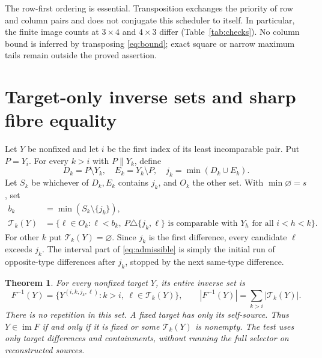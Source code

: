 \documentclass[a4paper,10pt]{amsart}
\newtheorem{theorem}{Theorem}[section]
\theoremstyle{remark}
\newcommand{\im}{\operatorname{im}}
\newcommand{\inc}{\mathrel{\|}}
\begin{document}
The row-first ordering is essential. Transposition exchanges the priority
of row and column pairs and does not conjugate this scheduler to itself.
In particular, the finite image counts at $3\times4$ and $4\times3$
differ (Table~\ref{tab:checks}). No column bound is inferred by transposing
\eqref{eq:bound}; exact square or narrow maximum tails remain outside
the proved assertion.

\section{Target-only inverse sets and sharp fibre equality}

Let $Y$ be nonfixed and let $i$ be the first index of its least
incomparable pair. Put $P=Y_i$. For every $k>i$ with $P\inc Y_k$, define
\[
 D_k=P\setminus Y_k,\quad E_k=Y_k\setminus P,\quad
 j_k=\min(D_k\cup E_k).
\]
Let $S_k$ be whichever of $D_k,E_k$ contains $j_k$, and $O_k$ the
other set. With $\min\varnothing=s$, set
\begin{align}
 b_k&=\min(S_k\setminus\{j_k\}),\nonumber\\
 \mathcal T_k(Y)&=\{\ell\in O_k:\ell<b_k,\
 P\triangle\{j_k,\ell\}\text{ is comparable with }Y_h
 \text{ for all }i<h<k\}. \label{eq:admissible}
\end{align}
For other $k$ put $\mathcal T_k(Y)=\varnothing$. Since $j_k$ is the first
difference, every candidate $\ell$ exceeds $j_k$. The interval part
of \eqref{eq:admissible} is simply the initial run of opposite-type
differences after $j_k$, stopped by the next same-type difference.

\begin{theorem}\label{thm:inverse}
For every nonfixed target $Y$, its entire inverse set is
\begin{equation}\label{eq:inverse}
 F^{-1}(Y)=
 \{Y^{(i,k,j_k,\ell)}: k>i,\ \ell\in\mathcal T_k(Y)\},
 \qquad
 |F^{-1}(Y)|=\sum_{k>i}|\mathcal T_k(Y)|.
\end{equation}
There is no repetition in this set. A fixed target has only its self-source.
Thus $Y\in\im F$ if and only if it is fixed or some $\mathcal T_k(Y)$
is nonempty. The test uses only target differences and containments,
without running the full selector on reconstructed sources.
\end{theorem}
\end{document}
